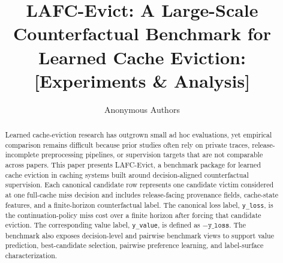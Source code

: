 \documentclass[sigconf,anonymous,nonacm]{acmart}
\newcommand{\lafc}{LAFC-Evict}
\begin{document}
\title{\lafc: A Large-Scale Counterfactual Benchmark for Learned Cache Eviction: \texorpdfstring{[Experiments \& Analysis]}{[Experiments \& Analysis]}}

\author{Anonymous Authors}

\begin{abstract}
\begin{sloppypar}
Learned cache-eviction research has outgrown small ad hoc evaluations, yet empirical comparison remains difficult because prior studies often rely on private traces, release-incomplete preprocessing pipelines, or supervision targets that are not comparable across papers. This paper presents \lafc, a benchmark package for learned cache eviction in caching systems built around decision-aligned counterfactual supervision. Each canonical candidate row represents one candidate victim considered at one full-cache miss decision and includes release-facing provenance fields, cache-state features, and a finite-horizon counterfactual label. The canonical loss label, \texttt{y\_loss}, is the continuation-policy miss cost over a finite horizon after forcing that candidate eviction. The corresponding value label, \texttt{y\_value}, is defined as $-\texttt{y\_loss}$. The benchmark also exposes decision-level and pairwise benchmark views to support value prediction, best-candidate selection, pairwise preference learning, and label-surface characterization.


\end{sloppypar}
\end{abstract}
\end{document}

